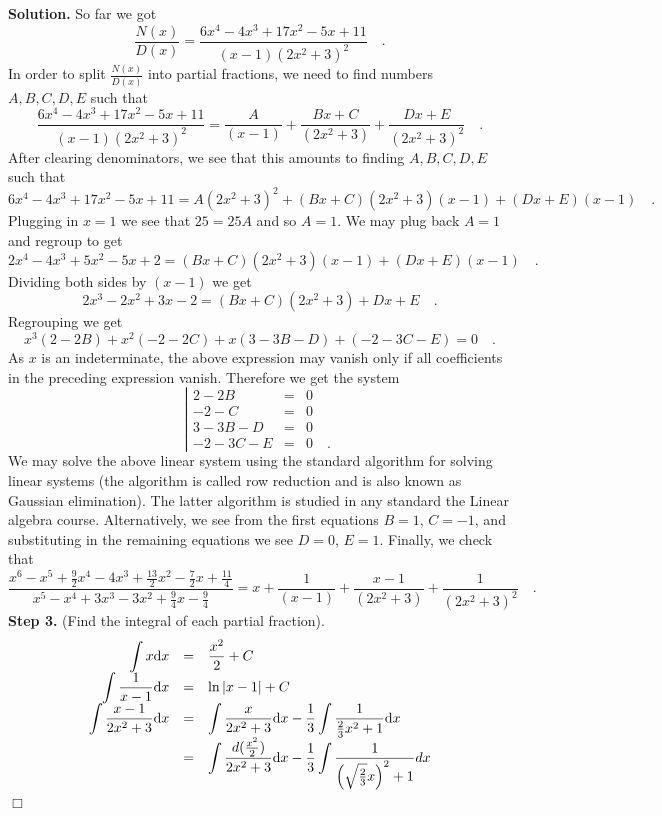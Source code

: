 \documentclass[12pt]{book}
\newenvironment{solution}{\medskip\noindent\textbf{Solution.} }{$\Box$}
\begin{document}
\begin{solution}
So far we got
\[
\frac{N(x)}{D(x)}= \frac{6 x^{4}-4 x^{3}+17 x^{2}-5 x+11}{(x-1)(2x^2+3)^2}\quad .
\]
In order to split $\frac{N(x)}{D(x)}$ into partial fractions, we need to find numbers $A, B, C, D, E$ such that
\[
\frac{6 x^{4}-4 x^{3}+17 x^{2}-5 x+11}{(x-1)(2x^2+3)^2}= \frac{A}{(x-1)}+\frac{Bx+C}{(2x^2+3)}+\frac{Dx+E}{(2x^2+3)^2}\quad .
\]
After clearing denominators, we see that this amounts to finding $A, B, C, D, E$ such that
\[
6 x^{4}-4 x^{3}+17 x^{2}-5 x+11= A(2x^2+3)^2+ (Bx+C)(2x^2+3)(x-1) + (Dx+E)(x-1)\quad .
\]
Plugging in $x=1$ we see that $25=25A $ and so $A=1$. We may plug back $A=1$ and regroup to get
\[
2x^{4}-4x^{3}+5x^{2}-5x+2= (Bx+C)(2x^2+3)(x-1) + (Dx+E)(x-1)\quad .
\]
Dividing both sides by $(x-1)$ we get
\[
2x^{3}-2x^{2}+3x-2= (Bx+C)(2x^2+3)+Dx+E\quad .
\]
Regrouping we get
\[
x^{3}(2- 2B) + x^2(-2-2C)+x(3-3B-D)+(-2-3C-E)=0\quad.
\]
As $x$ is an indeterminate, the above expression may vanish only if all coefficients in the preceding expression vanish. Therefore we get the system
\[
\left| \begin{array}{rcl}
2-2B&=&0\\
-2-C&=&0\\
3-3B-D&=&0\\
-2-3C-E&=&0\quad .
\end{array}   \right.
\]
We may solve the above linear system using the standard algorithm for solving linear systems (the algorithm is called row reduction and is also known as Gaussian elimination). The latter algorithm is studied in any standard the Linear algebra course. Alternatively, we see from the first equations $B=1$, $C=-1$, and substituting in the remaining equations we see $D=0$, $E=1$. Finally, we check that
\[
\frac{x^{6}-x^{5}+\frac{9}{2} x^{4}-4 x^{3}+\frac{13}{2} x^{2}-\frac{7}{2} x+\frac{11}{4}}{x^{5}-x^{4}+3 x^{3}-3 x^{2}+\frac{9}{4} x-\frac{9}{4}}
=x+\frac{1}{(x-1)}+\frac{x-1}{(2x^2+3)}+\frac{1}{(2x^2+3)^2}\quad .
\]
\textbf{Step 3.} (Find the integral of each partial fraction).
\[
\begin{array}{rcl}
\displaystyle\int x {\normalfont \text{d}} x &= &\displaystyle \frac{x ^2}2+C\\
\displaystyle\int \frac{1}{x-1} {\normalfont \text{d}} x &=&\displaystyle  \ln|x-1|+C\\
\displaystyle\int \frac{x-1}{2x^2+3} {\normalfont \text{d}} x &=& \displaystyle \int\frac{x}{2x^2+3}{\normalfont \text{d}} x -\frac{1}{3}\int \frac{1}{\frac23x^2+1}{\normalfont \text{d}} x\\
&=& \displaystyle  \int \frac{d(\frac{x^2}2)}{2x^2+3}{\normalfont \text{d}} x-\frac{1}{3} \int \frac{1}{\left(\sqrt{\frac23}x\right)^2+1} d x\\

\end{array}\]
\end{solution}
\end{document}

